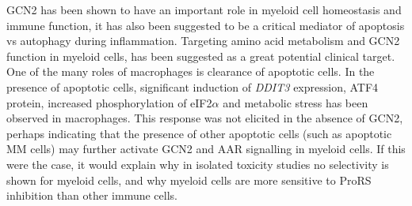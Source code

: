 GCN2 has been shown to have an important role in myeloid cell homeostasis and immune function\cite{halaby2019gcn2,ravishankar2015amino}, it has also been suggested to be a critical mediator of apoptosis vs autophagy during inflammation.
Targeting amino acid metabolism and GCN2 function in myeloid cells, has been suggested as a great potential clinical target\cite{liu2014role}.
One of the many roles of macrophages is clearance of apoptotic cells\cite{gordon2018macrophage}.
In the presence of apoptotic cells, significant induction of \textit{DDIT3} expression, ATF4 protein, increased phosphorylation of eIF2$\alpha$ and metabolic stress has been observed in macrophages\cite{ravishankar2012tolerance, ravishankar2015amino}.
This response was not elicited in the absence of GCN2\cite{ravishankar2015amino}, perhaps indicating that the presence of other apoptotic cells (such as apoptotic MM cells) may further activate GCN2 and AAR signalling in myeloid cells.
If this were the case, it would explain why in isolated toxicity studies no selectivity is shown for myeloid cells, and why myeloid cells are more sensitive to ProRS inhibition than other immune cells.


